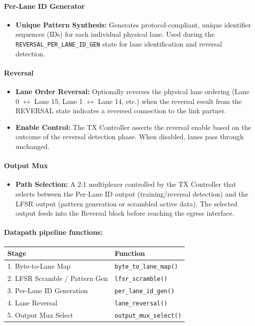 \documentclass[11pt,a4paper]{article}
\begin{document}
\paragraph{Per-Lane ID Generator}

\begin{itemize}
  \item \textbf{Unique Pattern Synthesis:} Generates protocol-compliant, unique identifier sequences (IDs) for each individual physical lane. Used during the \texttt{REVERSAL\_PER\_LANE\_ID\_GEN} state for lane identification and reversal detection.
\end{itemize}


\paragraph{Reversal}

\begin{itemize}
  \item \textbf{Lane Order Reversal:} Optionally reverses the physical lane ordering (Lane 0 $\leftrightarrow$ Lane 15, Lane 1 $\leftrightarrow$ Lane 14, etc.) when the reversal result from the REVERSAL state indicates a reversed connection to the link partner.
  \item \textbf{Enable Control:} The TX Controller asserts the reversal enable based on the outcome of the reversal detection phase. When disabled, lanes pass through unchanged.
\end{itemize}


\paragraph{Output Mux}

\begin{itemize}
  \item \textbf{Path Selection:} A 2:1 multiplexer controlled by the TX Controller that selects between the Per-Lane ID output (training/reversal detection) and the LFSR output (pattern generation or scrambled active data). The selected output feeds into the Reversal block before reaching the egress interface.
\end{itemize}


\paragraph{Datapath pipeline functions:}


\begin{tabularx}{\textwidth}{|X|X|}
\hline
\textbf{Stage} & \textbf{Function} \\
\hline
1. Byte-to-Lane Map & \texttt{byte\_to\_lane\_map()} \\
\hline
2. LFSR Scramble / Pattern Gen & \texttt{lfsr\_scramble()} \\
\hline
3. Per-Lane ID Generation & \texttt{per\_lane\_id\_gen()} \\
\hline
4. Lane Reversal & \texttt{lane\_reversal()} \\
\hline
5. Output Mux Select & \texttt{output\_mux\_select()} \\
\hline
\end{tabularx}
\end{document}
